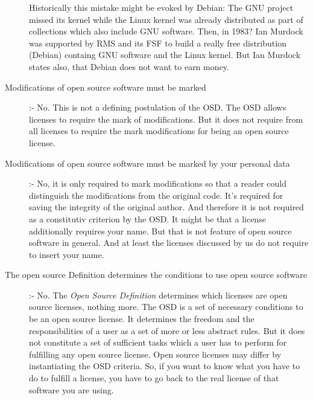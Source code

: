 \begin{description}
  Historically this mistake might be evoked by Debian: The GNU project missed
  its kernel while the Linux kernel was already distributed as part of
  collections which also include GNU software. Then, in 1983? Ian Murdock was
  supported by RMS and its FSF to build a really free distribution (Debian)
  containg GNU software and the Linux kernel. But Ian Murdock states also, that
  Debian does not want to earn money.
  \item[Modifications of open source software must be marked] :- No. This is not
  a defining postulation of the OSD. The OSD allows licenses to require the mark
  of modifications. But it does not require from all licenses to require the mark
  modifications for being an open source license.
  \item[Modifications of open source software must be marked by your personal
  data] :- No, it is only required to mark modifications so that a reader could
  distinguish the modifications from the original code. It's required for saving
  the integrity of the original author. And therefore it is not required as a
  constitutiv criterion by the OSD. It might be that a license additionally
  requires your name. But that is not feature of open source software in general.
  And at least the licenses discussed by us do not require to insert your name.
  \item[The open source Definition determines the conditions to use open source
  software] :- No. The \emph{Open Source Definition} determines which licenses
  are open source licenses, nothing more. The OSD is a set of necessary
  conditions to be an open source license. It determines the freedom and the
  responsibilities of a user as a set of more or less abstract rules. But it
  does not constitute a set of sufficient tasks which a user has to perform for
  fulfilling any open source license. Open source licenses may differ by
  instantiating the OSD criteria. So, if you want to know what you have to do to
  fulfill a license, you have to go back to the real license of that software
  you are using.
\end{description}

%
